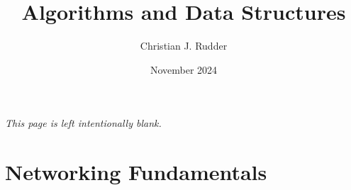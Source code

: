 \documentclass{memoir}
\title{Algorithms and Data Structures}
\author{Christian J. Rudder}
\date{November 2024}
\begin{document}
\maketitle
\setcounter{tocdepth}{2}

\tableofcontents

\newpage
\thispagestyle{empty}
\mbox{}
\vfill
\begin{center}
    \textit{This page is left intentionally blank.}
\end{center}
\vfill
\newpage


\chapter{Networking Fundamentals}



\end{document}
